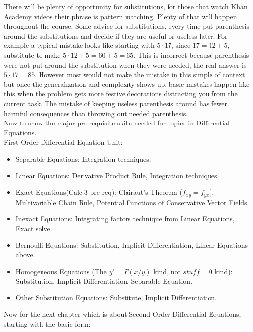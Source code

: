 \documentclass[12pt]{article}
\begin{document}
There will be plenty of opportunity for substitutions, for those that watch Khan Academy videos their phrase is pattern matching. Plenty of that will happen throughout the course. Some advice for substitutions, every time put parenthesis around the substitutions and decide if they are useful or useless later. For example a typical mistake looks like starting with $5\cdot17$, since $17=12+5$, substitute to make $5\cdot12+5=60+5=65$. This is incorrect because parenthesis were not put around the substitution when they were needed, the real answer is $5\cdot17=85$. However most would not make the mistake in this simple of context but once the generalization and complexity shows up, basic mistakes happen like this when the problem gets more festive decorations distracting you from the current task. The mistake of keeping useless parenthesis around has fewer harmful consequences than throwing out needed parenthesis. \\

Now to show the major pre-requisite skills needed for topics in Differential Equations. \\

First Order Differential Equation Unit:

\begin{itemize}
    \item Separable Equations: Integration techniques.
    \item Linear Equations: Derivative Product Rule, Integration techniques.
    \item Exact Equations(Calc 3 pre-req): Clairaut's Theorem ($f_{xy}=f_{yx}$), Multivariable Chain Rule, Potential Functions of Conservative Vector Fields.
    \item Inexact Equations: Integrating factors technique from Linear Equations, Exact solve.
    \item Bernoulli Equations: Substitution, Implicit Differentiation, Linear Equations above.
    \item Homogeneous Equations (The $y'=F(x/y)$ kind, not $stuff=0$ kind): Substitution, Implicit Differentiation, Separable Equation.
    \item Other Substitution Equations: Substitute, Implicit Differentiation.
\end{itemize}

\vspace{20pt}

Now for the next chapter which is about Second Order Differential Equations, starting with the basic form:
\end{document}
